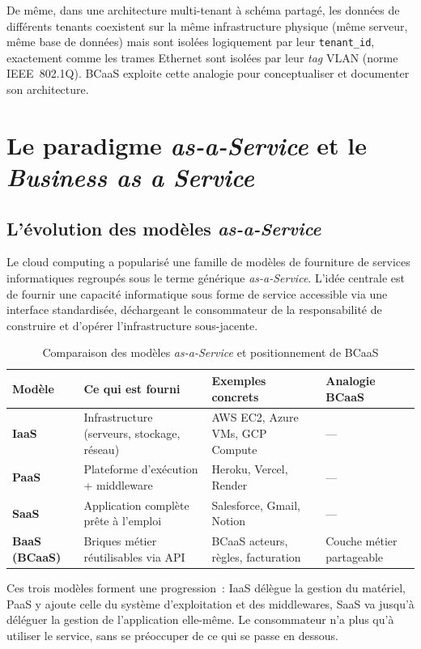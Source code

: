 De même, dans une architecture multi-tenant à schéma partagé, les données de différents
tenants coexistent sur la même infrastructure physique (même serveur, même base de
données) mais sont isolées logiquement par leur \texttt{tenant\_id}, exactement comme les
trames Ethernet sont isolées par leur \textit{tag} VLAN (norme IEEE~802.1Q). BCaaS
exploite cette analogie pour conceptualiser et documenter son architecture.

\section{Le paradigme \textit{as-a-Service} et le \textit{Business as a Service}}
\label{sec:baas}

\subsection{L'évolution des modèles \textit{as-a-Service}}
\label{subsec:aas-evolution}

Le cloud computing a popularisé une famille de modèles de fourniture de services
informatiques regroupés sous le terme générique \textit{as-a-Service}. L'idée centrale
est de fournir une capacité informatique sous forme de service accessible via une interface
standardisée, déchargeant le consommateur de la responsabilité de construire et d'opérer
l'infrastructure sous-jacente.
\begin{table}[ht]
  \centering
  \caption{Comparaison des modèles \textit{as-a-Service} et positionnement de BCaaS}
  \label{tab:aas}
  \renewcommand{\arraystretch}{1.3}
  \begin{tabularx}{\textwidth}{>{\bfseries}p{2.2cm}
                               >{\raggedright\arraybackslash}X
                               >{\raggedright\arraybackslash}X
                               >{\raggedright\arraybackslash}X}
    \toprule
    \textbf{Modèle} & \textbf{Ce qui est fourni} & \textbf{Exemples concrets} & \textbf{Analogie BCaaS} \\
    \midrule
    IaaS & Infrastructure (serveurs, stockage, réseau) & AWS EC2, Azure VMs, GCP Compute & --- \\
    PaaS & Plateforme d'exécution + middleware & Heroku, Vercel, Render & --- \\
    SaaS & Application complète prête à l'emploi & Salesforce, Gmail, Notion & --- \\
    BaaS (BCaaS) & Briques métier réutilisables via API & BCaaS acteurs, règles, facturation & Couche métier partageable \\
    \bottomrule
  \end{tabularx}
\end{table}
Ces trois modèles forment une progression~: IaaS délègue la gestion du matériel, PaaS y
ajoute celle du système d'exploitation et des middlewares, SaaS va jusqu'à déléguer la
gestion de l'application elle-même. Le consommateur n'a plus qu'à utiliser le service,
sans se préoccuper de ce qui se passe en dessous.

